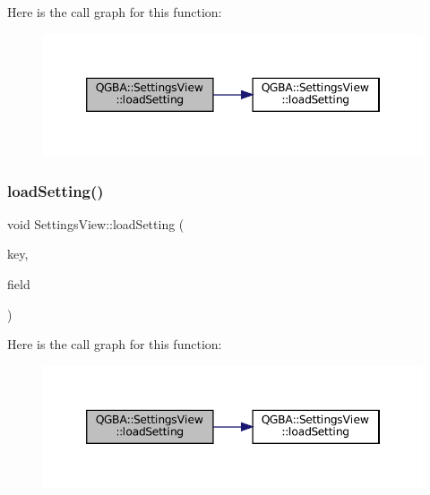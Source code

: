 Here is the call graph for this function\+:
\nopagebreak
\begin{figure}[H]
\begin{center}
\leavevmode
\includegraphics[width=346pt]{class_q_g_b_a_1_1_settings_view_aae9e9c3c12f0f635735dd18c90633f47_cgraph}
\end{center}
\end{figure}
\mbox{\label{class_q_g_b_a_1_1_settings_view_a9ab8f0bc7cc6577245b2f0206b7d0975}} 
\subsubsection{\texorpdfstring{load\+Setting()}{loadSetting()}\hspace{0.1cm}{\footnotesize\ttfamily [5/7]}}
{\footnotesize\ttfamily void Settings\+View\+::load\+Setting (\begin{DoxyParamCaption}\item[{const char $\ast$}]{key,  }\item[{Q\+Slider $\ast$}]{field }\end{DoxyParamCaption})\hspace{0.3cm}{\ttfamily [private]}}

Here is the call graph for this function\+:
\nopagebreak
\begin{figure}[H]
\begin{center}
\leavevmode
\includegraphics[width=346pt]{class_q_g_b_a_1_1_settings_view_a9ab8f0bc7cc6577245b2f0206b7d0975_cgraph}
\end{center}
\end{figure}
\mbox{\label{class_q_g_b_a_1_1_settings_view_ac177861b2dd7aea144a68f554f069db5}} 

